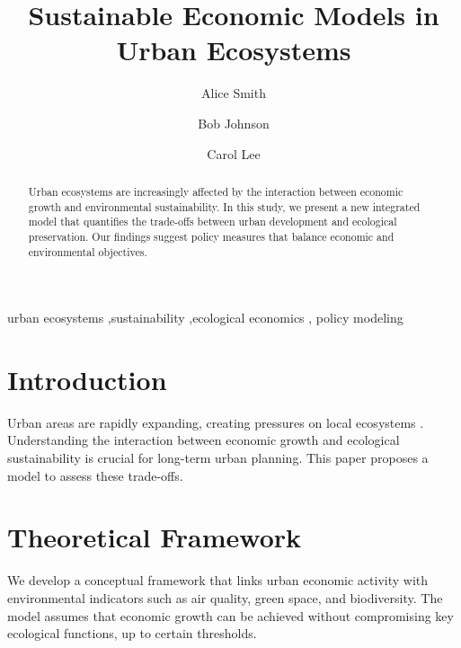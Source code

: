 \documentclass[
  authoryear,
  5p,
  twocolumn]{elsarticle}
\begin{document}
\begin{frontmatter}
\title{Sustainable Economic Models in Urban Ecosystems}
\author[1]{Alice Smith%
%
}
\author[2]{Bob Johnson%
%
}
\author[1]{Carol Lee%
%
}





        
\begin{abstract}
Urban ecosystems are increasingly affected by the interaction between
economic growth and environmental sustainability. In this study, we
present a new integrated model that quantifies the trade-offs between
urban development and ecological preservation. Our findings suggest
policy measures that balance economic and environmental objectives.
\end{abstract}





\begin{keyword}
    urban ecosystems \sep sustainability \sep ecological economics \sep 
    policy modeling
\end{keyword}
\end{frontmatter}
    

\section{Introduction}\label{introduction}

Urban areas are rapidly expanding, creating pressures on local
ecosystems \citep{knuth84}. Understanding the interaction between
economic growth and ecological sustainability is crucial for long-term
urban planning. This paper proposes a model to assess these trade-offs.

\section{Theoretical Framework}\label{theoretical-framework}

We develop a conceptual framework that links urban economic activity
with environmental indicators such as air quality, green space, and
biodiversity. The model assumes that economic growth can be achieved
without compromising key ecological functions, up to certain thresholds.
\end{document}
